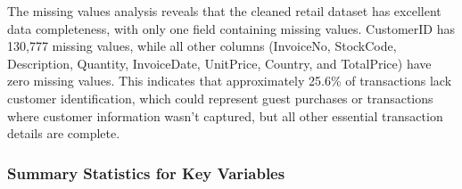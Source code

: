\documentclass[
]{article}
\begin{document}
The missing values analysis reveals that the cleaned retail dataset has
excellent data completeness, with only one field containing missing
values. CustomerID has 130,777 missing values, while all other columns
(InvoiceNo, StockCode, Description, Quantity, InvoiceDate, UnitPrice,
Country, and TotalPrice) have zero missing values. This indicates that
approximately 25.6\% of transactions lack customer identification, which
could represent guest purchases or transactions where customer
information wasn't captured, but all other essential transaction details
are complete.\newpage

\subsubsection{Summary Statistics for Key
Variables}\label{summary-statistics-for-key-variables}
\end{document}

